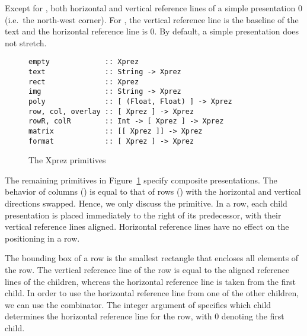 Except for , both horizontal and vertical reference lines of a simple presentation 0 (i.e.\ the north-west corner). For ,  the vertical reference line is the baseline of the text and the horizontal reference line is 0. By default, a  simple presentation does not stretch.

\begin{figure}
\begin{small}
\begin{center}
\begin{small}
\begin{verbatim}
empty             :: Xprez
text              :: String -> Xprez             
rect              :: Xprez                       
img               :: String -> Xprez             
poly              :: [ (Float, Float) ] -> Xprez 
row, col, overlay :: [ Xprez ] -> Xprez          
rowR, colR        :: Int -> [ Xprez ] -> Xprez   
matrix            :: [[ Xprez ]] -> Xprez
format            :: [ Xprez ] -> Xprez
\end{verbatim}
\end{small}
\caption{The {\sc Xprez} primitives} \label{xprezprim} 
\end{center}
\end{small}
\end{figure}


The remaining primitives in Figure~\ref{xprezprim} specify composite presentations. The behavior of columns () is equal to that of rows () with the horizontal and vertical directions swapped. Hence, we only discuss the  primitive. In a row, each child presentation is placed immediately to the right of its predecessor, with their vertical reference lines aligned. Horizontal reference lines have no effect on the positioning in a row.

\begin{center}
\end{center}

The bounding box of a row is the smallest rectangle that encloses all elements of the row. The vertical reference line of the row is equal to the aligned reference lines of the children, whereas the horizontal reference line is taken from the first child. In order to use the horizontal reference line from one of the other children, we can use the  combinator. The integer argument of  specifies which child determines the horizontal reference line for the row, with 0 denoting the first child. 

